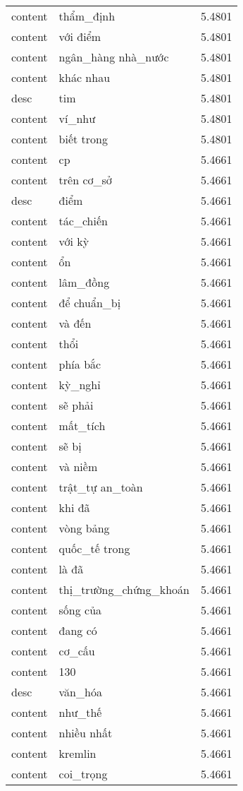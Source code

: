 \documentclass{article}
\begin{document}
\begin{tabular}{lll}
content & thẩm\_định & 5.4801\\
content & với điểm & 5.4801\\
content & ngân\_hàng nhà\_nước & 5.4801\\
content & khác nhau & 5.4801\\
desc & tim & 5.4801\\
content & ví\_như & 5.4801\\
content & biết trong & 5.4801\\
content & cp & 5.4661\\
content & trên cơ\_sở & 5.4661\\
desc & điểm & 5.4661\\
content & tác\_chiến & 5.4661\\
content & với kỳ & 5.4661\\
content & ổn & 5.4661\\
content & lâm\_đồng & 5.4661\\
content & để chuẩn\_bị & 5.4661\\
content & và đến & 5.4661\\
content & thổi & 5.4661\\
content & phía bắc & 5.4661\\
content & kỳ\_nghỉ & 5.4661\\
content & sẽ phải & 5.4661\\
content & mất\_tích & 5.4661\\
content & sẽ bị & 5.4661\\
content & và niềm & 5.4661\\
content & trật\_tự an\_toàn & 5.4661\\
content & khi đã & 5.4661\\
content & vòng bảng & 5.4661\\
content & quốc\_tế trong & 5.4661\\
content & là đã & 5.4661\\
content & thị\_trường\_chứng\_khoán & 5.4661\\
content & sống của & 5.4661\\
content & đang có & 5.4661\\
content & cơ\_cấu & 5.4661\\
content & 130 & 5.4661\\
desc & văn\_hóa & 5.4661\\
content & như\_thế & 5.4661\\
content & nhiều nhất & 5.4661\\
content & kremlin & 5.4661\\
content & coi\_trọng & 5.4661\\

\end{tabular}
\end{document}
